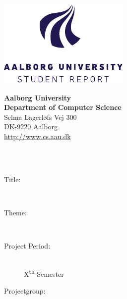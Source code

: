 \begin{titlepage}
    \setlength{\textwidth}{15cm}
    \noindent
    \begin{nopagebreak}
        \begin{minipage}{0.4\textwidth}
            \centering
            \includegraphics[width=\textwidth]{img/aau_logo_en.pdf}
        \end{minipage} \hfill
        \begin{minipage}{0.4\textwidth}
            \flushright
            \textbf{Aalborg University}\\
            \textbf{Department of Computer Science}\\
            Selma Lagerløfs Vej 300\\
            DK-9220 Aalborg\\
            \url{http://www.cs.aau.dk}
        \end{minipage}\\
        \vspace{1cm}\\
        \begin{minipage}[t]{0.4\textwidth}
            \begin{description}
                \item[Title:] \hfill\\
                    \TITLE
                \item[Theme:] \hfill\\
                    \THEME
                \item[Project Period:] \hfill\\
                    X\textsuperscript{th} Semester
                \item[Projectgroup:] \hfill\\

\end{description}
\end{minipage}
\end{nopagebreak}
\end{titlepage}
